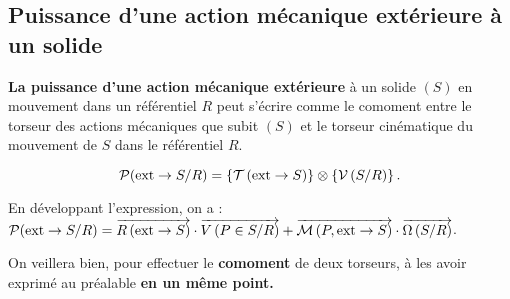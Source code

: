 \documentclass[10pt,fleqn]{article} %
\begin{document}
%
%
%

\subsection{Puissance d'une action mécanique extérieure à un solide}
\begin{defi}
\textbf{La puissance d'une action mécanique extérieure} à un solide $(S)$ en mouvement dans un référentiel $R$ peut s'écrire comme le comoment entre le torseur des actions mécaniques que subit $(S)$ et le torseur cinématique du mouvement de $S$ dans le référentiel $R$.

$$
\mathcal{P}(\text{ext} \rightarrow S/R)=\left\{\mathcal{T} \left(\text{ext}\rightarrow S \right) \right\}\otimes \left\{\mathcal{V} \left(S/R \right) \right\}.
$$

En développant l'expression, on a :
$\mathcal{P}(\text{ext} \rightarrow S/R)=\overrightarrow{R\left( {\text{ext}} \rightarrow {S}\right)}\cdot \overrightarrow{V\left( {P} \in {S}/{R}\right)}+ \overrightarrow{\mathcal{M}\left( {P}, {\text{ext}} \rightarrow {S}\right)}\cdot\overrightarrow{\Omega\left( {S}/{R}\right)}$.
\end{defi}



\begin{warn}
On veillera bien, pour effectuer le \textbf{comoment} de deux torseurs, à les avoir exprimé au préalable {\textbf{en un même point.}}
\end{warn}
\end{document}
